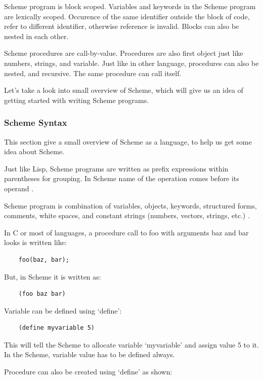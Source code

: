 Scheme program is block scoped. Variables and keywords in the Scheme program are lexically scoped. Occurence of the same identifier outside the block of code, refer to different identifier, otherwise reference is invalid. Blocks can also be nested in each other.

Scheme procedures are call-by-value. Procedures are also first object just like numbers, strings, and variable. Just like in other language, procedures can also be nested, and recursive. The same procedure can call itself. 

Let's take a look into small overview of Scheme, which will give us an idea of getting started with writing Scheme programs.

\subsubsection{Scheme Syntax}

This section give a small overview of Scheme as a language, to help us get some idea about Scheme.

Just like Lisp, Scheme programs are written as prefix expressions within parentheses for grouping. In Scheme name of the operation comes before its operand \cite{Krishnamurthi:1994:IS:197149.197166}.

Scheme program is combination of variables, objects, keywords, structured forms, comments, white spaces, and constant strings (numbers, vectors, strings, etc.)  \cite{SchemeLanguage}.


In C or most of languages, a procedure call to foo with arguments baz and bar looks is written like: 

\begin{lstlisting}
	foo(baz, bar);
\end{lstlisting}

But, in Scheme it is written as: 

\begin{lstlisting}
	(foo baz bar)
\end{lstlisting}

Variable can be defined using `define':

\begin{lstlisting} 
	(define myvariable 5)
\end{lstlisting}

This will tell the Scheme to allocate variable `myvariable' and assign value 5 to it. In the Scheme, variable value has to be defined always.

Procedure can also be created using `define' as shown:


